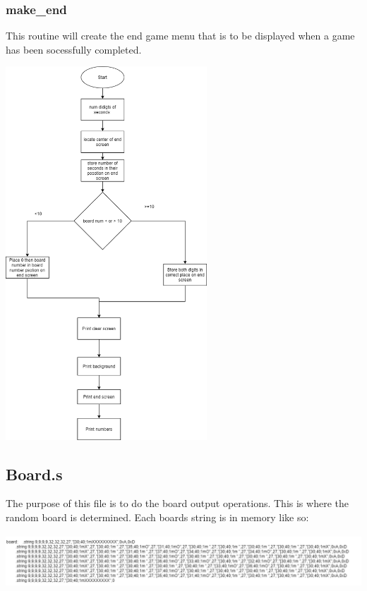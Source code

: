\documentclass{article}
\begin{document}
    \newpage
    \subsubsection{make\_end}
        This routine will create the end game menu that is to be displayed when a game has been socessfully
        completed.
        \begin{center}
            {\includegraphics[height=14cm]{make_end.png}\centering} 
        \end{center}

    \newpage


\subsection{Board.s}
        The purpose of this file is to do the board output operations. This is 
        where the random board is determined. Each boards string is in memory 
        like so:
        \begin{center}
            {\includegraphics[height=2cm]{board.png}\centering} 
        \end{center}
\end{document}
